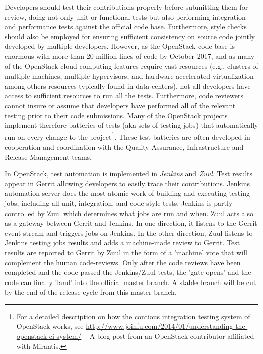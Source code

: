 \documentclass[dvipsnames]{bmcart}
\theoremstyle{definition}
\begin{document}
Developers should test their contributions properly before submitting them for review, doing not only unit or functional tests but also performing integration and performance tests against the official code base. Furthermore, style checks should also be employed for ensuring sufficient consistency on source code jointly developed by multiple developers. However, as the OpenStack code base is enormous with more than 20 million lines of code by October 2017, and as many of the OpenStack cloud computing features require vast resources (e.g., clusters of multiple machines, multiple hypervisors, and hardware-accelerated virtualization among others resources typically found in data centers), not all developers have access to sufficient resources to run all the tests. Furthermore, code reviewers cannot insure or assume that developers have performed all of the relevant testing prior to their code submissions. Many of the OpenStack projects  implement therefore batteries of tests (aka sets of testing jobs) that automatically run on every change to the project\footnote{For a detailed description on how the contious integration testing system of OpenStack works, see \url{http://www.joinfu.com/2014/01/understanding-the-openstack-ci-system/} -- A blog post from an OpenStack contributor affiliated with Mirantis.}. 
These test batteries are often developed in cooperation and coordination with the Quality Assurance, Infrastructure and Release Management teams. 

In OpenStack, test automation is implemented in \textit{Jenkins} and \textit{Zuul}. Test results appear in \url{Gerrit} allowing developers to easily trace their contributions. 
Jenkins automation server does the most atomic work of building and executing testing jobs, including all unit, integration, and code-style tests. Jenkins is partly controlled by Zuul which determines what jobs are run and when. Zuul acts also as a gateway between Gerrit and Jenkins. In one direction, it listens to the Gerrit event stream and triggers jobs  on Jenkins. In the other direction, Zuul listens to Jenkins testing jobs results and adds a machine-made review to Gerrit. Test results are reported to Gerrit by Zuul in the form of a 'machine' vote that will complement the human code-reviews. Only after the code reviews have been completed and the code passed the Jenkins/Zuul tests, the 'gate opens' and the code can finally 'land' into the official master branch. A stable branch will be cut by the end of the release cycle from this master branch.  
\end{document}
